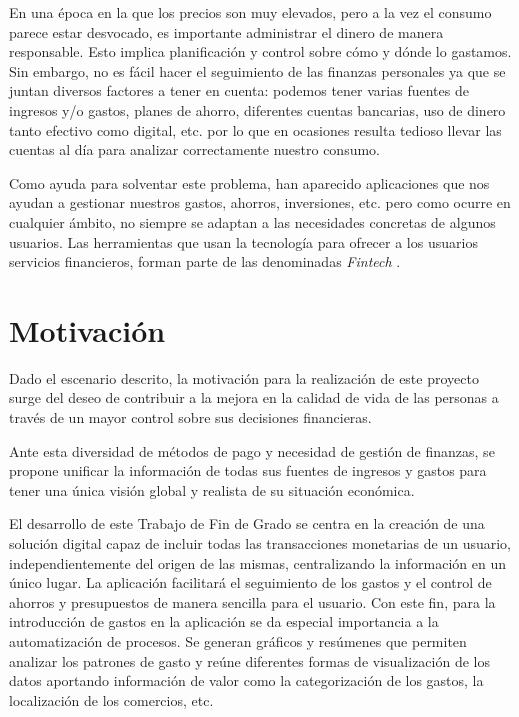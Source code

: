 En una época en la que los precios son muy elevados, pero a la vez el consumo parece estar desvocado, es importante administrar el dinero de manera responsable. Esto implica planificación y control sobre cómo y dónde lo gastamos.
Sin embargo, no es fácil hacer el seguimiento de las finanzas personales ya que se 
juntan diversos factores a tener en cuenta: podemos tener varias fuentes de ingresos y/o 
gastos, planes de ahorro, diferentes cuentas bancarias, uso de dinero tanto 
efectivo como digital, etc. por lo que en ocasiones resulta tedioso 
llevar las cuentas al día para analizar correctamente nuestro consumo.

Como ayuda para solventar este problema, han aparecido aplicaciones que nos ayudan a gestionar nuestros gastos, ahorros, inversiones, etc. pero como ocurre en cualquier ámbito, no siempre se adaptan a las necesidades concretas de algunos usuarios. Las herramientas que usan la tecnología para ofrecer a los usuarios servicios financieros, forman parte de las denominadas \textit{Fintech} \cite{schueffel2016taming}.

\section{Motivación}
Dado el escenario descrito, la motivación para la realización de este proyecto surge del deseo de contribuir a la mejora en la calidad de vida de las personas a través de un mayor control sobre sus decisiones financieras.

Ante esta diversidad de métodos de pago y necesidad de gestión de finanzas, se propone unificar la información de todas sus fuentes de ingresos y gastos para tener una única visión global y realista de su situación económica.

El desarrollo de este Trabajo de Fin de Grado se centra en la creación de una solución digital capaz de incluir todas las transacciones monetarias de un usuario, independientemente del origen de las mismas, centralizando la información en un único lugar. La aplicación facilitará el seguimiento de los gastos y el control de ahorros y presupuestos de manera sencilla para el usuario. Con este fin, para la introducción de gastos en la aplicación se da especial importancia a la automatización de procesos. Se generan gráficos y resúmenes que permiten analizar los patrones de gasto y reúne diferentes formas de visualización de los datos aportando información de valor como la categorización de los gastos, la localización de los comercios, etc.\\

